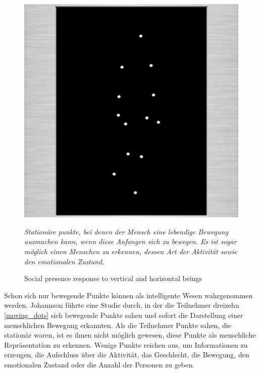 \documentclass[a4paper,11pt]{article}%
\renewcommand{\\}{\vspace*{0.5\baselineskip} \newline}
\begin{document}
\begin{figure}[H]
		\begin{footnotesize}
		\centering
			\includegraphics[scale= 0.5]{Abbildungen/moving_dots.JPG}
			\caption[Abbildung 1]{Social presence response to vertical and
horizontal beings}
			\textit{Stationäre punkte, bei denen der Mensch eine lebendige Bewegung ausmachen kann, wenn diese Anfangen sich zu bewegen. Es ist sogar möglich einen Menschen zu erkennen, dessen Art der Aktivität sowie den emotionalen Zustand. \citep{biocca2002defining} \citep[p.76-89]{johansson1975visual}}

			\label{moving_dots}
		\end{footnotesize}
	\end{figure}

Schon sich nur bewegende Punkte können als intelligente Wesen wahrgenommen werden. Johannson \citep[p.76-89]{johansson1975visual} führte eine Studie durch, in der die Teilnehmer dreizehn \autoref{moving_dots} sich bewegende Punkte sahen und sofort die Darstellung einer menschlichen Bewegung erkannten. Als die Teilnehmer Punkte sahen, die stationär waren, ist es ihnen nicht möglich gewesen, diese Punkte als menschliche Repräsentation zu erkennen. Wenige Punkte reichen aus, um Informationen zu erzeugen, die Aufschluss über die Aktivität, das Geschlecht, die Bewegung, den emotionalen Zustand oder die Anzahl der Personen zu geben.
\end{document}
